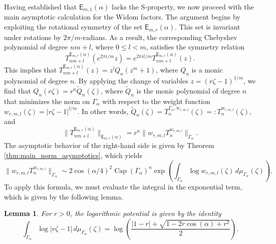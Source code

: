 \documentclass[12pt,oneside,reqno]{amsart}
\newtheorem{lemma}[theorem]{Lemma}
\theoremstyle{definition}
\numberwithin{equation}{section}
\newcommand{\E}{{\mathsf E}}
\renewcommand{\Cap}{\operatorname{Cap}}
\begin{document}
Having established that $\E_{m,1}(\alpha)$ lacks the S-property, we now proceed with the main asymptotic calculation for the Widom factors. The argument begins by exploiting the rotational symmetry of the set $\E_{m,r}(\alpha)$. This set is invariant under rotations by $2\pi/m$-radians. As a result, the corresponding Chebyshev polynomial of degree $nm + l$, where $0 \leq l < m$, satisfies the symmetry relation 
\[
T_{nm+l}^{\E_{m,r}(\alpha)}(e^{2\pi i/m}z) = e^{2\pi il/m} T_{nm+l}^{\E_{m,r}(\alpha)}(z).
\]
This implies that $T_{nm+l}^{\E_{m,r}(\alpha)}(z) = z^lQ_n(z^m+1)$, where $Q_n$ is a monic polynomial of degree $n$. By applying the change of variables $z = (r\zeta-1)^{1/m}$, we find that $Q_n(r\zeta) = r^n\tilde{Q}_n(\zeta)$, where $\tilde{Q}_n$ is the monic polynomial of degree $n$ that minimizes the norm on $\Gamma_\alpha$ with respect to the weight function $w_{r,m,l}(\zeta) = |r\zeta-1|^{l/m}$. In other words, $\tilde{Q}_n(\zeta) = T_{n}^{\Gamma_\alpha, w_{r,m,l}}(\zeta)=:T_{n}^{w_{r,m,l}}(\zeta)$, and
\[
\|T_{nm+l}^{\E_{m,r}(\alpha)}\|_{\E_{m,r}(\alpha)} = r^n\|w_{r,m,l}T_n^{w_{r,m,l}}\|_{\Gamma_\alpha}.
\]
The asymptotic behavior of the right-hand side is given by Theorem \ref{thm:main_norm_asymptotics}, which yields
\begin{equation}
	\|w_{r,m,l}T_n^{w_{r,m,l}}\|_{\Gamma_\alpha}\sim 2\cos(\alpha/4)^2\Cap(\Gamma_\alpha)^n\exp\left(\int_{\Gamma_\alpha}\log w_{r,m,l}(\zeta)\,d\mu_{\Gamma_\alpha}(\zeta)\right).
	\label{eq:cheb_on_lemniscatic_arcs_weight_asymptotics}
\end{equation}
To apply this formula, we must evaluate the integral in the exponential term, which is given by the following lemma.
\begin{lemma}
\label{lem:logarithmic_integral}
For $r>0$, the logarithmic potential is given by the identity
\begin{equation}
\label{2.9}
\int_{\Gamma_\alpha}\log |r\zeta-1| \, d\mu_{\Gamma_\alpha}(\zeta) = 
\log\left(\frac{\vert 1-r \vert + \sqrt{1-2r\cos(\alpha)+r^2}}{2}\right).
\end{equation}
\end{lemma}
\end{document}
